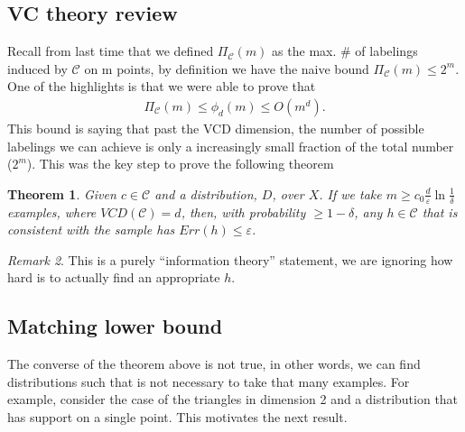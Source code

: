 \documentclass[12pt, letterpaper]{article}
\numberwithin{equation}{section} %
\newcommand{\mc}{\mathcal}
\newcommand{\ve}{\varepsilon}
\newtheorem{theorem}{Theorem}[section]
\theoremstyle{definition}
\theoremstyle{remark}
\newtheorem{remark}[theorem]{Remark}
\begin{document}
\subsection{VC theory review}
Recall from last time that we defined $\Pi_{\mc C}(m)$ as the max. \# of labelings induced by $\mc C$ on m points, by definition we have the naive bound $\Pi_{\mc C}(m)\leq 2^m$. One of the highlights is that we were able to prove that
\begin{align}
 \Pi_{\mc C}(m) \leq \phi_d(m) \leq O(m^d).
\end{align}
This bound is saying that past the VCD dimension, the number of possible labelings we can achieve is only a increasingly small fraction of the total number ($2^m$). This was the key step to prove the following theorem
\begin{theorem}
    Given $c\in\mc C$ and a distribution, $D$, over $X$. If we take $m \geq c_0 \frac{d}\ve \ln \frac1\delta$ examples, where $VCD(\mc C)=d$, then, with probability $\geq 1-\delta$, any $h\in\mc C$ that is consistent with the sample has $Err(h)\leq \ve$.
\end{theorem}
\begin{remark}
    This is a purely ``information theory'' statement, we are ignoring how hard is to actually find an appropriate $h$.
\end{remark}

\subsection{Matching lower bound}
The converse of the theorem above is not true, in other words, we can find distributions such that is not necessary to take that many examples. For example, consider the case of the triangles in dimension 2 and a distribution that has support on a single point. This motivates the next result.
\end{document}
